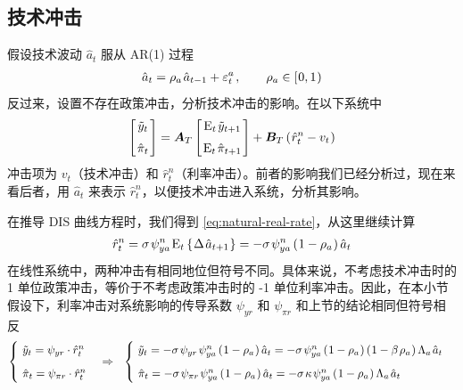 \subsection{技术冲击}

假设技术波动 \(\hat a_t\) 服从 AR(1) 过程
\begin{align*}
    \hat a_t=\rho_a\,\hat a\lt+\varepsilon_t^a\,,\qquad\rho_a\in\bksa{0,1}
\end{align*}
反过来，设置不存在政策冲击，分析技术冲击的影响。在以下系统中
\begin{align*}
    \matbks{
        \tilde y_t \\[6pt]
        \hat \pi_t
    } =
    \bsA_T\matbks{
        \meant\,\tilde y\nt \\[6pt]
        \meant\,\hat\pi\nt
    } +
    \bs B_T\bka{\hat r^n_t-v_t}
\end{align*}
冲击项为 \(v_t\)（技术冲击）和 \(\hat r^n_t\)（利率冲击）。前者的影响我们已经分析过，现在来看后者，用 \(\hat a_t\) 来表示 \(\hat r^n_t\)，以便技术冲击进入系统，分析其影响。

在推导 DIS 曲线方程时，我们得到 \ref{eq:natural-real-rate}，从这里继续计算
\begin{align*}
    \hat r^n_t=\sigma\,\psi^n_{ya}\,\meant\bkd{\D\hat a\nt}=-\sigma\,\psi^n_{ya}\bka{1-\rho_a}\hat a_t
\end{align*}
在线性系统中，两种冲击有相同地位但符号不同。具体来说，不考虑技术冲击时的 1 单位政策冲击，等价于不考虑政策冲击时的 -1 单位利率冲击。因此，在本小节假设下，利率冲击对系统影响的传导系数 \(\psi_{yr}\) 和 \(\psi_{\pi r}\) 和上节的结论相同但符号相反
\begin{align*}
    \begin{cases}
        \ \tilde y_t=\psi_{yr}\cdot\hat r^n_t\\[6pt]
        \ \hat\pi_t=\psi_{\pi r}\cdot\hat r^n_t
    \end{cases} \Rightarrow \ \
    \begin{cases}
        \ \tilde y_t=-\sigma\,\psi_{yr}\,\psi^n_{ya}\bka{1-\rho_a}\hat a_t=-\sigma\,\psi^n_{ya}\bka{1-\rho_a}\bka{1-\beta\,\rho_a}\Lambda_a\,\hat a_t\\[6pt]
        \ \hat\pi_t=-\sigma\,\psi_{\pi r}\,\psi^n_{ya}\bka{1-\rho_a}\hat a_t=-\sigma\,\kappa\,\psi^n_{ya}\bka{1-\rho_a}\Lambda_a\,\hat a_t
    \end{cases}
\end{align*}

